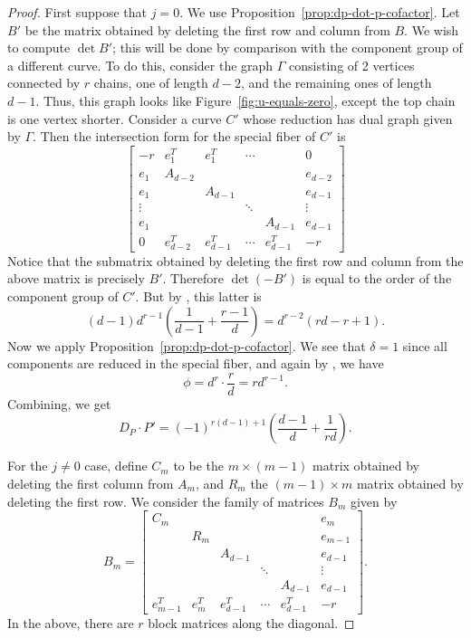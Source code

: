 \documentclass[reqno]{amsart}
\theoremstyle{definition}
\theoremstyle{remark}
\begin{document}
\begin{proof}
  First suppose that $j = 0$. We use Proposition~\ref{prop:dp-dot-p-cofactor}. Let $B'$ be the matrix obtained by deleting the first row and column from $B$. We wish to compute $\det B'$; this will be done by comparison with the component group of a different curve. To do this, consider the graph $\Gamma$ consisting of 2 vertices connected by $r$ chains, one of length $d - 2$, and the remaining ones of length $d-1$. Thus, this graph looks like Figure~\ref{fig:u-equals-zero}, except the top chain is one vertex shorter. Consider a curve $C'$ whose reduction has dual graph given by $\Gamma$. Then the intersection form for the special fiber of $C'$ is
  \[
  \left[\begin{array}{cccccc}
      -r & e_1^T & e_1^T & \cdots & &  0 \\
      e_1 & A_{d-2} & & & & e_{d-2} \\
      e_1 & &A_{d-1} & & & e_{d-1} \\
      \vdots & & & \ddots & & \vdots \\
      e_1 & & & & A_{d-1} & e_{d-1} \\
      0 & e_{d-2}^T & e_{d-1}^T & \cdots & e_{d-1}^T & -r
\end{array}\right]
  \]
  Notice that the submatrix obtained by deleting the first row and column from the above matrix is precisely $B'$. Therefore $\det (-B')$ is equal to the order of the component group of $C'$. But by \cite[p.~283???]{blr}, this latter is
  \[
  (d-1)d^{r-1}\left(\frac{1}{d-1} + \frac{r-1}{d}\right) = d^{r-2}(rd-r+1).
  \]
  Now we apply Proposition~\ref{prop:dp-dot-p-cofactor}. We see that $\delta = 1$ since all components are reduced in the special fiber, and again by \cite[p.~283]{blr}, we have
  \[
  \phi = d^{r}\cdot \frac{r}{d} = rd^{r-1}.
  \]
  Combining, we get
  \[
  D_P \cdot P' = (-1)^{r(d-1)+1}\left(\frac{d-1}{d} + \frac{1}{rd}\right).
  \]

  For the $j \neq 0$ case, define $C_{m}$ to be the $m \times (m-1)$ matrix obtained by deleting the first column from $A_m$, and $R_m$ the $(m-1) \times m$ matrix obtained by deleting the first row. We consider the family of matrices $B_m$ given by
  \[
  B_m =   \left[\begin{array}{cccccc}
C_{m} & & & & & e_{m} \\
& R_m & & & & e_{m-1} \\
& & A_{d-1} & & & e_{d-1} \\
& & & \ddots & & \vdots \\
& & & & A_{d-1} & e_{d-1} \\
e_{m-1}^T & e_{m}^T & e_{d-1}^T & \cdots & e_{d-1}^T & -r
\end{array}\right].
  \]
  In the above, there are $r$ block matrices along the diagonal.


\end{proof}
\end{document}

